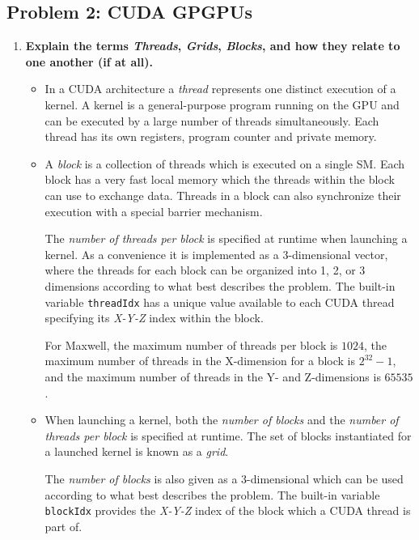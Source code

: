 \subsection*{Problem 2: CUDA GPGPUs}

\begin{enumerate}

\item \textbf{Explain the terms \textit{Threads}, \textit{Grids}, \textit{Blocks}, and how they relate to one another (if at all).}

\begin{itemize}

\item In a \ac{CUDA} architecture a \textit{thread} represents one distinct execution of a kernel. A kernel is a general-purpose program running on the \ac{GPU} and can be executed by a large number of threads simultaneously. Each thread has its own registers, program counter and private memory. 

\item A \textit{block} is a collection of threads which is executed on a single \ac{SM}. Each block has a very fast local memory which the threads within the block can use to exchange data. Threads in a block can also synchronize their execution with a special barrier mechanism.

The \textit{number of threads per block} is specified at runtime when launching a kernel. As a convenience it is implemented as a 3-dimensional vector, where the threads for each block can be organized into 1, 2, or 3 dimensions according to what best describes the problem. The built-in variable \texttt{threadIdx} has a unique value available to each \ac{CUDA} thread specifying its \textit{X-Y-Z} index within the block.

For Maxwell, the maximum number of threads per block is $1024$, the maximum number of threads in the X-dimension for a block is $2^{32}-1$, and the maximum number of threads in the Y- and Z-dimensions is $65535$.

\item When launching a kernel, both the \textit{number of blocks} and the \textit{number of threads per block} is specified at runtime. The set of blocks instantiated for a launched kernel is known as a \textit{grid}.

The \textit{number of blocks} is also given as a 3-dimensional which can be used according to what best describes the problem. The built-in variable \texttt{blockIdx} provides the \textit{X-Y-Z} index of the block which a \ac{CUDA} thread is part of.


\end{itemize}
\end{enumerate}

